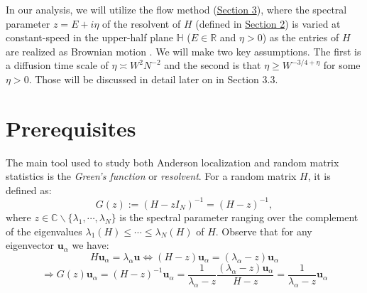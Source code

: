 \documentclass[11pt]{article}
\begin{document}
\noindent In our analysis, we will utilize the flow method (\hyperref[sec:flow]{Section 3}), where the spectral parameter $z=E+i\eta$ of the resolvent of $H$ (defined in \hyperref[sec:prereq]{Section 2}) is varied at constant-speed in the upper-half plane $\mathbb{H}$ ($E\in\mathbb{R}$ and $\eta>0$) as the entries of $H$ are realized as Brownian motion \cite{bandSDE}. We will make two key assumptions. The first is a diffusion time scale of $\eta \asymp W^2 N^{-2}$ and the second is that $\eta\geq W^{-3/4+\eta}$ for some $\eta>0$. Those will be discussed in detail later on in Section 3.3.


\newpage
\section{Prerequisites}
\label{sec:prereq}
The main tool used to study both Anderson localization and random matrix statistics is the \textit{Green's function} or \textit{resolvent}. For a random matrix $H$, it is defined as: $$G(z) := (H-zI_N)^{-1} = (H-z)^{-1},$$
where $z\in \mathbb{C}\backslash \{\lambda_1, \cdots, \lambda_N\}$ is the spectral parameter ranging over the complement of the eigenvalues $\lambda_1(H)\leq \cdots \leq \lambda_N(H)$ of $H$. Observe that for any eigenvector $\mathbf{u}_\alpha$ we have:
$$H\mathbf{u}_\alpha = \lambda_\alpha \mathbf{u}\Leftrightarrow (H - z)\mathbf{u}_\alpha = (\lambda_\alpha-z)\mathbf{u}_\alpha$$
\begin{equation}
\Rightarrow G(z)\mathbf{u}_\alpha = (H-z)^{-1}\mathbf{u}_\alpha = \frac{1}{\lambda_\alpha-z}\frac{(\lambda_\alpha-z)\mathbf{u}_\alpha }{H-z}=\frac{1}{\lambda_\alpha -z}\mathbf{u}_\alpha\end{equation}
\end{document}
